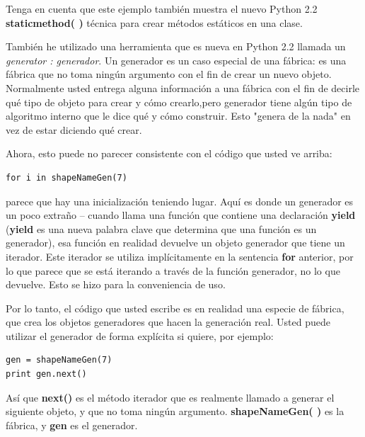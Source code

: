 \documentclass{article}
\begin{document}
Tenga en cuenta que este ejemplo también muestra el nuevo Python 2.2 \textbf{staticmethod( )} técnica para crear métodos estáticos en una clase.     \newline

También he utilizado una herramienta que es nueva en Python 2.2 llamada un \textit{generator : generador}. Un generador es un caso especial de una fábrica: es una fábrica que no toma ningún argumento con el fin de crear un nuevo objeto. Normalmente usted entrega alguna información a una fábrica con el fin de decirle qué tipo de objeto para crear y cómo crearlo,pero generador tiene algún tipo de algoritmo interno que le dice qué y cómo construir. Esto "genera de la nada" en vez de estar diciendo qué crear. \newline

Ahora, esto puede no parecer consistente con el código que usted ve arriba:     \newline

\begin{lstlisting} 
for i in shapeNameGen(7)
\end{lstlisting}

parece que hay una inicialización teniendo lugar. Aquí es donde un generador es un poco extraño – cuando llama una función que contiene una declaración \textbf{yield} (\textbf{yield} es una nueva palabra clave que determina que una función es un generador), esa función en realidad devuelve un objeto generador que tiene un iterador. Este iterador se utiliza implícitamente en la sentencia \textbf{for} anterior, por lo que parece que se está iterando a través de la función generador, no lo que devuelve. Esto se hizo para la conveniencia de uso.    \newline

Por lo tanto, el código que usted escribe es en realidad una especie de fábrica, que crea los objetos generadores que hacen la generación real. Usted puede utilizar el generador de forma explícita si quiere, por ejemplo:    \newline

\begin{lstlisting} 
gen = shapeNameGen(7) 
print gen.next() 
\end{lstlisting}

Así que \textbf{next()} es el método iterador que es realmente llamado a generar el siguiente objeto, y que no toma ningún argumento. \textbf{shapeNameGen( )} es la fábrica, y \textbf{gen} es el generador.     \newline
\end{document}
